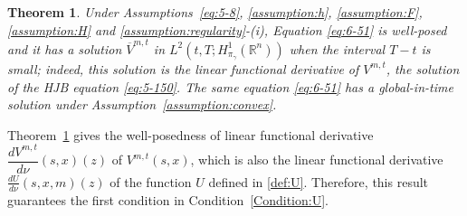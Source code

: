 \documentclass[11pt]{article}
\numberwithin{equation}{section}
\newtheorem{theorem}{Theorem}[section]
\newcommand{\brn}{{\mathbb{R}^n}}
\newcommand{\1}{\mbox{1\hspace{-1mm}I}}
\begin{document}
\begin{theorem}\label{thm:D_zV}
    Under Assumptions~\ref{eq:5-8}, \ref{assumption:h}, \ref{assumption:F}, \ref{assumption:H} and \ref{assumption:regularity}-(i), Equation \eqref{eq:6-51} is well-posed and it has a solution $\overline{V}^{m,t}$ in $L^{2}\left(t,T;H_{\pi_{\gamma}}^{1}(\brn)\right)$ when the interval $T-t$ is small; indeed, this solution is the linear functional derivative of $V^{m,t}$, the solution of the HJB equation \eqref{eq:5-150}. The same equation \eqref{eq:6-51} has a global-in-time solution under Assumption~\ref{assumption:convex}.
\end{theorem}

Theorem~\ref{thm:D_zV} gives the well-posedness of linear functional derivative $\dfrac{dV^{m,t}}{d\nu}(s,x)(z)$ of $V^{m,t}(s,x)$, which is also the linear functional derivative $\frac{dU}{d\nu}(s,x,m)(z)$ of the function $U$ defined in \eqref{def:U}. Therefore, this result guarantees the first condition in Condition~\ref{Condition:U}.
\end{document}
